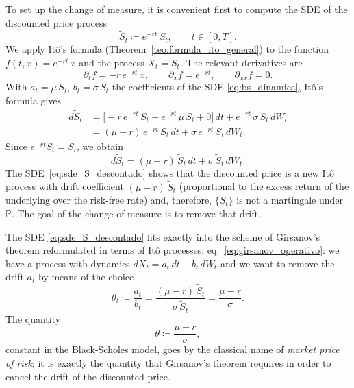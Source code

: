 \documentclass[11pt,a4paper,oneside]{report}
\theoremstyle{plain}
\theoremstyle{definition}
\theoremstyle{remark}
\newcommand{\PP}{\mathbb{P}}
\newcommand{\1}{\mathbf{1}}
\newcommand{\eqdef}{\coloneqq}
\begin{document}
To set up the
change of measure, it is convenient first to compute the SDE of the
discounted price process
\begin{equation}\label{eq:precio_descontado_def}
  \widetilde S_t \eqdef e^{-rt}\, S_t,
  \qquad t \in [0, T].
\end{equation}
We apply Itô's formula (Theorem~\ref{teo:formula_ito_general}) to
the function $f(t, x) = e^{-rt}\, x$ and the process $X_t = S_t$. The
relevant derivatives are
\begin{equation*}
  \partial_t f = -r\, e^{-rt}\, x, \qquad
  \partial_x f = e^{-rt}, \qquad
  \partial_{xx} f = 0.
\end{equation*}
With $a_t = \mu\, S_t$, $b_t = \sigma\, S_t$ the coefficients of the
SDE \eqref{eq:bs_dinamica}, Itô's formula gives
\begin{align*}
  d\widetilde S_t
  &= \bigl[-r\, e^{-rt}\, S_t + e^{-rt}\, \mu\, S_t + 0\bigr]\, dt
   + e^{-rt}\, \sigma\, S_t\, dW_t \\
  &= (\mu - r)\, e^{-rt}\, S_t\, dt + \sigma\, e^{-rt}\, S_t\, dW_t.
\end{align*}
Since $e^{-rt} S_t = \widetilde S_t$, we obtain
\begin{equation}\label{eq:sde_S_descontado}
  \boxed{\; d\widetilde S_t
        = (\mu - r)\, \widetilde S_t\, dt
        + \sigma\, \widetilde S_t\, dW_t. \;}
\end{equation}
The SDE~\eqref{eq:sde_S_descontado} shows that the discounted price
is a new Itô process with drift coefficient
$(\mu - r)\, \widetilde S_t$ (proportional to the excess return of
the underlying over the risk-free rate) and, therefore,
$\{\widetilde S_t\}$ is not a martingale under $\PP$. The goal of the
change of measure is to remove that drift.

The SDE
\eqref{eq:sde_S_descontado} fits exactly into the scheme of Girsanov's
theorem reformulated in terms of Itô processes,
eq.~\eqref{eq:girsanov_operativo}: we have a process with dynamics
$dX_t = a_t\, dt + b_t\, dW_t$ and we want to remove the drift $a_t$
by means of the choice
\begin{equation*}
  \theta_t \eqdef \frac{a_t}{b_t}
              = \frac{(\mu - r)\, \widetilde S_t}
                     {\sigma\, \widetilde S_t}
              = \frac{\mu - r}{\sigma}.
\end{equation*}
The quantity
\begin{equation}\label{eq:precio_riesgo}
  \theta \eqdef \frac{\mu - r}{\sigma},
\end{equation}
constant in the Black-Scholes model, goes by the classical name of
\emph{market price of risk}: it is exactly the quantity that
Girsanov's theorem requires in order to cancel the drift of the
discounted price.
\end{document}
